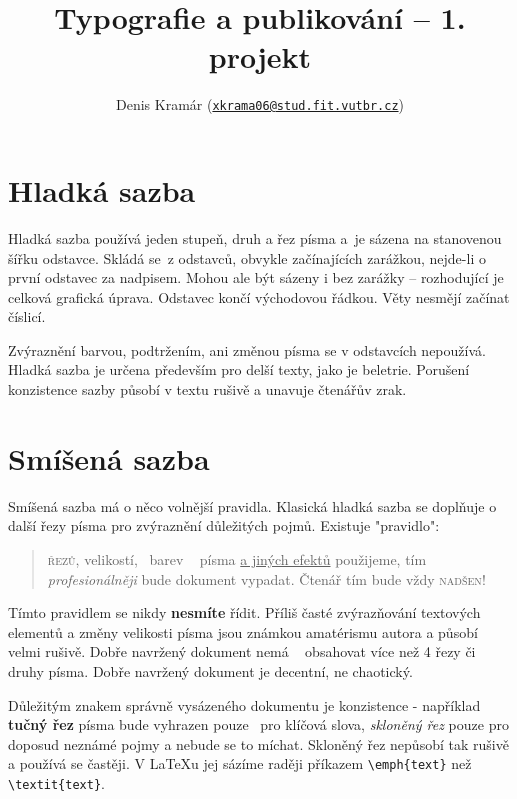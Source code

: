 \documentclass[a4paper, 10pt, twocolumn]{article}
\title{Typografie a publikování -- 1. projekt}
\author{Denis Kramár (\texttt{\href{mailto:xkrama06@stud.fit.vutbr.cz}{xkrama06@stud.fit.vutbr.cz}})}
\date{}
\begin{document}
\maketitle

\section{Hladká sazba}

Hladká sazba používá jeden stupeň, druh a řez písma a~je sázena na stanovenou šířku odstavce. Skládá se~z odstavců, obvykle začínajících zarážkou, nejde-li o~ první odstavec za nadpisem. Mohou ale být sázeny i bez zarážky -- rozhodující je celková grafická úprava. Odstavec končí východovou řádkou. Věty nesmějí začínat číslicí.

Zvýraznění barvou, podtržením, ani změnou písma se v odstavcích nepoužívá. Hladká sazba je určena především pro delší texty, jako je beletrie. Porušení konzistence sazby působí v textu rušivě a unavuje čtenářův zrak.

\section{Smíšená sazba}

Smíšená sazba má o něco volnější pravidla. Klasická hladká sazba se doplňuje o další řezy písma pro zvýraznění důležitých pojmů. Existuje "pravidlo":

\begin{quotation}
{ \selectfont{Čím více druhů,}} {\textsc{řezů}}, {\tiny{velikostí}}, ~barev ~  pís\-ma {\underline{a jiných efektů}} použijeme, tím {\large{\emph{profesionálněji}}} bude dokument vypadat. Čtenář tím bude vždy \textsc{nadšen}!
\end{quotation}

{\footnotesize{Tímto}} pravidlem se nikdy {\textbf{nesmíte}} řídit. Příliš časté {\large{zvýrazňování}} textových elementů a změny velikosti {\huge{písma}} jsou známkou amatérismu autora a působí {\Huge{velmi}} rušivě. Dobře navržený dokument nemá ~ obsahovat více než 4 řezy či druhy písma. Dobře navržený dokument je decentní, ne chaotický.

Důležitým znakem správně vysázeného dokumentu je konzistence - například {\textbf{tučný řez}} písma bude vyhrazen pouze~ pro klíčová slova, {\textit{skloněný řez}} pouze pro doposud neznámé pojmy a nebude se to míchat. Skloněný řez nepůsobí tak rušivě a používá se častěji. V \LaTeX u jej sázíme raději příkazem \verb!\emph{text}! než \verb!\textit{text}!.
\end{document}
